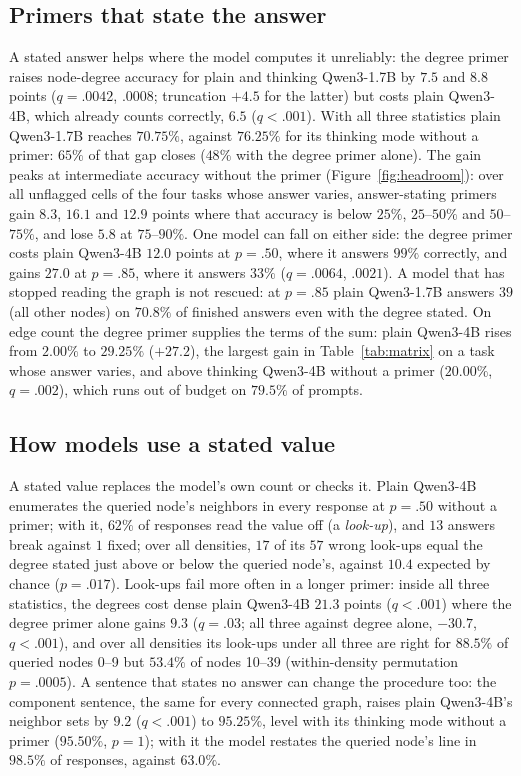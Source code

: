 \documentclass[11pt]{article}
\begin{document}
\subsection{Primers that state the answer}
A stated answer helps where the model computes it unreliably: the degree primer raises node-degree accuracy for plain and thinking Qwen3-1.7B by $7.5$ and $8.8$ points ($q=.0042$, $.0008$; truncation $+4.5$ for the latter) but costs plain Qwen3-4B, which already counts correctly, $6.5$ ($q<.001$). %
With all three statistics plain Qwen3-1.7B reaches $70.75\%$, against $76.25\%$ for its thinking mode without a primer: $65\%$ of that gap closes ($48\%$ with the degree primer alone). %
The gain peaks at intermediate accuracy without the primer (Figure~\ref{fig:headroom}): over all unflagged cells of the four tasks whose answer varies, answer-stating primers gain $8.3$, $16.1$ and $12.9$ points where that accuracy is below $25\%$, $25$--$50\%$ and $50$--$75\%$, and lose $5.8$ at $75$--$90\%$. %
One model can fall on either side: the degree primer costs plain Qwen3-4B $12.0$ points at $p=.50$, where it answers $99\%$ correctly, and gains $27.0$ at $p=.85$, where it answers $33\%$ ($q=.0064$, $.0021$). %
A model that has stopped reading the graph is not rescued: at $p=.85$ plain Qwen3-1.7B answers $39$ (all other nodes) on $70.8\%$ of finished answers even with the degree stated. %
On edge count the degree primer supplies the terms of the sum: plain Qwen3-4B rises from $2.00\%$ to $29.25\%$ ($+27.2$), the largest gain in Table~\ref{tab:matrix} on a task whose answer varies, and above thinking Qwen3-4B without a primer ($20.00\%$, $q=.002$), which runs out of budget on $79.5\%$ of prompts. %

\subsection{How models use a stated value}
A stated value replaces the model's own count or checks it. Plain Qwen3-4B enumerates the queried node's neighbors in every response at $p=.50$ without a primer; with it, $62\%$ of responses read the value off (a \emph{look-up}), %
and $13$ answers break against $1$ fixed; %
over all densities, $17$ of its $57$ wrong look-ups equal the degree stated just above or below the queried node's, against $10.4$ expected by chance ($p=.017$). %
Look-ups fail more often in a longer primer: inside all three statistics, the degrees cost dense plain Qwen3-4B $21.3$ points ($q<.001$) where the degree primer alone gains $9.3$ ($q=.03$; all three against degree alone, $-30.7$, $q<.001$), %
and over all densities its look-ups under all three are right for $88.5\%$ of queried nodes 0--9 but $53.4\%$ of nodes 10--39 (within-density permutation $p=.0005$). %
A sentence that states no answer can change the procedure too: the component sentence, the same for every connected graph, raises plain Qwen3-4B's neighbor sets by $9.2$ ($q<.001$) to $95.25\%$, level with its thinking mode without a primer ($95.50\%$, $p=1$); with it the model restates the queried node's line in $98.5\%$ of responses, against $63.0\%$. %
\end{document}
